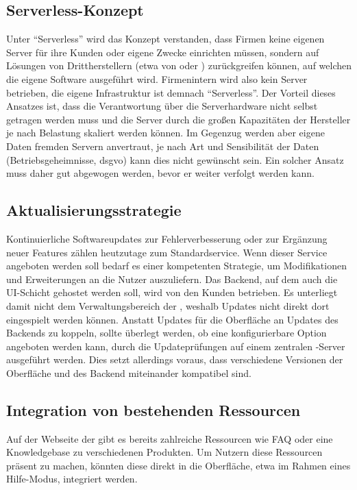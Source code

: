 \subsection{Serverless-Konzept}
Unter \enquote{Serverless} wird das Konzept verstanden, dass Firmen keine eigenen Server für ihre Kunden oder eigene Zwecke einrichten müssen, sondern auf Lösungen von Drittherstellern (etwa  von  oder ) zurückgreifen können, auf welchen die eigene Software ausgeführt wird. Firmenintern wird also kein Server betrieben, die eigene Infrastruktur ist demnach \enquote{Serverless}. Der Vorteil dieses Ansatzes ist, dass die Verantwortung über die Serverhardware nicht selbst getragen werden muss und die Server durch die großen Kapazitäten der Hersteller je nach Belastung skaliert werden können. Im Gegenzug werden aber eigene Daten fremden Servern anvertraut, je nach Art und Sensibilität der Daten (Betriebsgeheimnisse, \gls{dsgvo}) kann dies nicht gewünscht sein. Ein solcher Ansatz muss daher gut abgewogen werden, bevor er weiter verfolgt werden kann.

\subsection{Aktualisierungsstrategie}
Kontinuierliche Softwareupdates zur Fehlerverbesserung oder zur Ergänzung neuer Features zählen heutzutage zum Standardservice. Wenn dieser Service angeboten werden soll bedarf es einer kompetenten Strategie, um Modifikationen und Erweiterungen an die Nutzer auszuliefern. Das Backend, auf dem auch die UI-Schicht gehostet werden soll, wird von den Kunden betrieben. Es unterliegt damit nicht dem Verwaltungsbereich der , weshalb Updates nicht direkt dort eingespielt werden können. Anstatt Updates für die Oberfläche an Updates des Backends zu koppeln, sollte überlegt werden, ob eine konfigurierbare Option angeboten werden kann, durch die Updateprüfungen auf einem zentralen -Server ausgeführt werden. Dies setzt allerdings voraus, dass verschiedene Versionen der Oberfläche und des Backend miteinander kompatibel sind. 

\subsection{Integration von bestehenden Ressourcen}
Auf der Webseite der  gibt es bereits zahlreiche Ressourcen wie FAQ oder eine Knowledgebase zu verschiedenen Produkten. Um Nutzern diese Ressourcen präsent zu machen, könnten diese direkt in die Oberfläche, etwa im Rahmen eines Hilfe-Modus, integriert werden.

